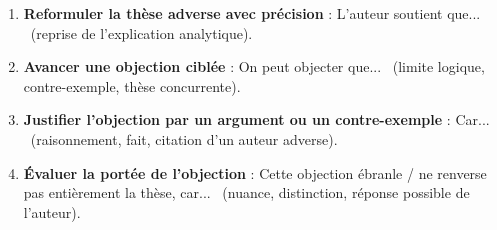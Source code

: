 \documentclass[11pt]{article}
\begin{document}
\begin{methode}
\begin{enumerate}
    \item \textbf{Reformuler la thèse adverse avec précision} : \guillemotleft L'auteur soutient que... \guillemotright\ (reprise de l'explication analytique).
    \item \textbf{Avancer une objection ciblée} : \guillemotleft On peut objecter que... \guillemotright\ (limite logique, contre-exemple, thèse concurrente).
    \item \textbf{Justifier l'objection par un argument ou un contre-exemple} : \guillemotleft Car... \guillemotright\ (raisonnement, fait, citation d'un auteur adverse).
    \item \textbf{Évaluer la portée de l'objection} : \guillemotleft Cette objection ébranle / ne renverse pas entièrement la thèse, car... \guillemotright\ (nuance, distinction, réponse possible de l'auteur).
\end{enumerate}
\end{methode}
\end{document}
